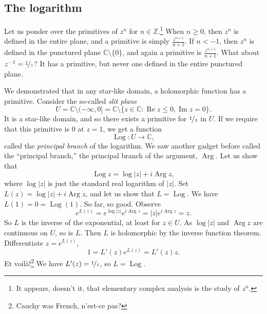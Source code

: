 \documentclass[12pt,openany]{book}
\newcommand{\glsadd}[2][]{}
\renewcommand{\Re}{\operatorname{Re}}
\renewcommand{\Im}{\operatorname{Im}}
\newcommand{\Arg}{\operatorname{Arg}}
\newcommand{\Log}{\operatorname{Log}}
\newcommand{\sabs}[1]{\lvert {#1} \rvert}
\newcommand{\C}{{\mathbb{C}}}
\newcommand{\Z}{{\mathbb{Z}}}
\newcommand{\myindex}[1]{#1\index{#1}}
\newcommand{\myquote}[1]{``#1''}
\theoremstyle{plain}
\theoremstyle{remark}
\theoremstyle{definition}
\theoremstyle{exercise}
\theoremstyle{example}
\begin{document}
\subsection{The logarithm}

Let us ponder over the primitives of $z^n$ for $n \in \Z$.\footnote{It appears,
doesn't it, that elementary complex analysis is the study of $z^n$.}
When $n \geq 0$, 
then $z^n$ is defined in the entire plane, and a primitive is
simply $\frac{z^{n+1}}{n+1}$.  If $n < -1$, then $z^n$ is defined
in the punctured plane $\C \setminus \{0\}$, and again
a primitive is $\frac{z^{n+1}}{n+1}$.  What about $z^{-1} =
\nicefrac{1}{z}$?  It has a primitive, but never one defined in
the entire punctured plane.

We demonstrated that in any star-like domain, a holomorphic function has a
primitive.  Consider the so-called \emph{\myindex{slit plane}}
\begin{equation*}
U = \C \setminus (-\infty,0] = \C \setminus \bigl\{ z \in \C : \Re z \leq 0 , \Im z = 0 \bigr\}.
\end{equation*}
It is a star-like domain, and
so there exists a
primitive for $\nicefrac{1}{z}$ in $U$.
If we
require that this primitive is $0$ at $z=1$,
we get a function
\glsadd{not:Log}%
\begin{equation*}
\Log \colon U \to \C ,
\end{equation*}
called the \emph{\myindex{principal branch}} of the logarithm.
We saw another gadget before called the \myquote{principal branch,} 
the principal branch of the argument, $\Arg$.  Let us show that
\begin{equation*}
\Log z = \log \sabs{z} + i \Arg z ,
\end{equation*}
where $\log \sabs{z}$ is just the standard real logarithm of $\sabs{z}$.
Set $L(z) = \log \sabs{z} + i \Arg z$, and let us show that $L = \Log$.
We have $L(1) = 0 = \Log(1)$.  So far, so good.
Observe
\begin{equation*}
e^{L(z)}
=
e^{\log \sabs{z}} e^{i \Arg z}
=
\sabs{z} e^{i \Arg z} = z .
\end{equation*}
So $L$ is the inverse of the exponential, at least for $z \in U$.
As $\log \sabs{z}$ and $\Arg z$ are continuous on $U$,
so is $L$.
Then $L$ is holomorphic by the inverse function
theorem.
Differentiate $z = e^{L(z)}$,
\begin{equation*}
1 = L'(z) e^{L(z)} = L'(z) z .
\end{equation*}
Et voil\`a!\footnote{Cauchy was French, n'est-ce pas?}
We have $L'(z) = \nicefrac{1}{z}$, so $L = \Log$.
\end{document}
